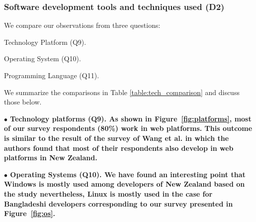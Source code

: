 \subsubsection{Software development tools and techniques used (D2)} \label{sec:rq2-d2}

We compare our observations from three questions: \begin{inparaenum}
\item Technology Platform (Q9).
\item Operating System (Q10).
\item Programming Language (Q11).
\end{inparaenum} We summarize the comparisons in Table \ref{table:tech_comparison} and discuss those below.

% 

\nd\bf{$\bullet$ Technology platforms (Q9).} As shown in
Figure~\ref{fig:platforms}, most of our survey respondents (80\%) work in web
platforms. This outcome is similar to the result of the survey of Wang et al.
\citep{Wang2018} in which the authors found that most of their respondents also
develop in web platforms in New Zealand.


\nd\bf{$\bullet$ Operating Systems (Q10).} We have found an interesting point
that Windows is mostly used among developers of New Zealand based on the study
\citep{Wang2018} nevertheless, Linux is mostly used in the case for Bangladeshi
developers corresponding to our survey presented in Figure~\ref{fig:os}.

